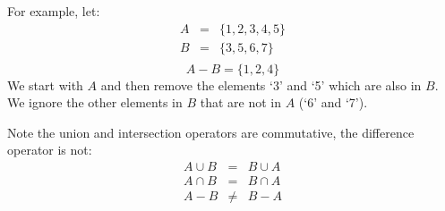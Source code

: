 \documentclass[letterpaper,12pt,fleqn]{article}
\begin{document}
\begin{center}
\end{center}

For example, let:
\begin{eqnarray*}
A &=& \{1, 2, 3, 4, 5\} \\
B &=& \{3, 5, 6, 7\} \\
\end{eqnarray*}
\[A-B=\{1, 2, 4\}\]
We start with $A$ and then remove the elements `3' and `5' which are also in
$B$. We ignore the other elements in $B$ that are not in $A$ (`6' and `7').

Note the union and intersection operators are commutative, the difference
operator is not:
\begin{eqnarray*}
A\cup B &=& B\cup A \\
A\cap B &=& B\cap A \\
A-B &\ne& B-A \\
\end{eqnarray*}
\end{document}
